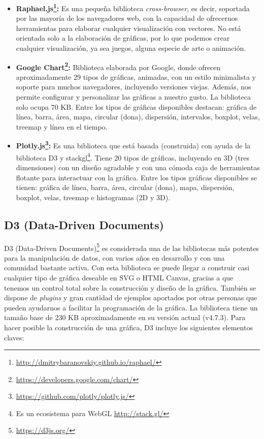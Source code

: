 \begin{itemize}
\item\textbf{Raphael.js\footnote{\url{http://dmitrybaranovskiy.github.io/raphael/}}:}
Es una pequeña biblioteca \textit{cross-browser}, es decir, soportada por las mayoría de los navegadores web, con la capacidad de ofrecernos herramientas para elaborar cualquier visualización con vectores. No está orientada solo a la elaboración de gráficas, por lo que podemos crear cualquier visualización, ya sea juegos, alguna especie de arte o animación.
\item\textbf{Google Chart\footnote{\url{https://developers.google.com/chart/}}:}
Biblioteca elaborada por Google, donde ofrecen aproximadamente 29 tipos de gráficas, animadas, con un estilo minimalista y soporte para muchos navegadores, incluyendo versiones viejas. Además, nos permite configurar y personalizar las gráficas a nuestro gusto. La biblioteca solo ocupa 70 KB. Entre los tipos de gráficas disponibles destacan: gráfica de línea, barra, área, mapa, circular (dona), dispersión, intervalos, boxplot, velas, treemap y línea en el tiempo.
\item\textbf{Plotly.js\footnote{\url{https://github.com/plotly/plotly.js/}}:}
Es una biblioteca que está basada (construida) con ayuda de la biblioteca D3 y stackgl\footnote{Es un ecosistema para WebGL \url{http://stack.gl/}}. Tiene 20 tipos de gráficas, incluyendo en 3D (tres dimensiones) con un diseño agradable y con una cómoda caja de herramientas flotante para interactuar con la gráfica. Entre los tipos gráficas disponibles se tienen: gráfica de línea, barra, área, circular (dona), mapa, dispersión, boxplot, velas, treemap e histogramas (2D y 3D).
\end{itemize}


\subsection{D3 (Data-Driven Documents)}
D3 (Data-Driven Documents)\footnote{\url{https://d3js.org/}} es considerada una de las bibliotecas más potentes para la manipulación de datos, con varios años en desarrollo y con una comunidad bastante activa. Con esta biblioteca se puede llegar a construir casi cualquier tipo de gráfica deseable en SVG o HTML Canvas, gracias a que tenemos un control total sobre la construcción y diseño de la gráfica. También se dispone de \textit{plugins} y gran cantidad de ejemplos aportados por otras personas que pueden ayudarnos a facilitar la programación de la gráfica. La biblioteca tiene un tamaño base de 230 KB aproximadamente en su versión actual (v4.7.3).
Para hacer posible la construcción de una gráfica, D3 incluye los siguientes elementos claves:


